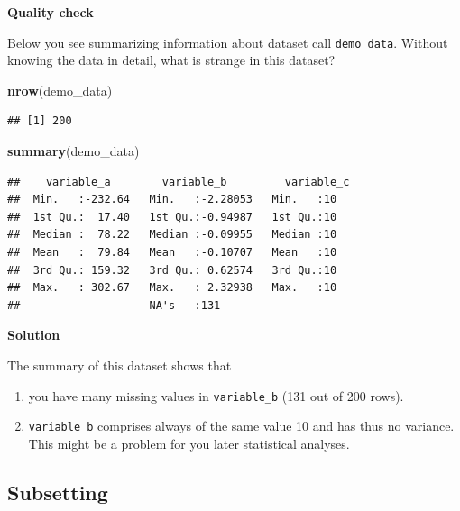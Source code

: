 \documentclass[
]{scrartcl}
\makeatletter
\newenvironment{Shaded}{\begin{snugshade}}{\end{snugshade}}
\newcommand{\KeywordTok}[1]{\textcolor[rgb]{0.13,0.29,0.53}{\textbf{#1}}}
\newcommand{\NormalTok}[1]{#1}
\providecommand{\tightlist}{%
  \setlength{\itemsep}{0pt}\setlength{\parskip}{0pt}}
\newenvironment{kframe}{%
\medskip{}
\setlength{\fboxsep}{.8em}
 \def\at@end@of@kframe{}%
 \ifinner\ifhmode%
  \def\at@end@of@kframe{\end{minipage}}%
  \begin{minipage}{\columnwidth}%
 \fi\fi%
 \def\FrameCommand##1{\hskip\@totalleftmargin \hskip-\fboxsep
 \colorbox{shadecolor}{##1}\hskip-\fboxsep
     \hskip-\linewidth \hskip-\@totalleftmargin \hskip\columnwidth}%
 \MakeFramed {\advance\hsize-\width
   \@totalleftmargin\z@ \linewidth\hsize
   \@setminipage}}%
 {\par\unskip\endMakeFramed%
 \at@end@of@kframe}
\newenvironment{rmdblock}[1]
  {
  \begin{itemize}
  \renewcommand{\labelitemi}{
    \raisebox{-.7\height}[0pt][0pt]{
      {\setkeys{Gin}{width=3em,keepaspectratio}\texttt{[image: images/\#1]}}
    }
  }
  \setlength{\fboxsep}{1em}
  \begin{kframe}
  \item
  }
  {
  \end{kframe}
  \end{itemize}
  }
\newenvironment{myexercise}
    {\begin{rmdblock}{exercise_green}}
    {\end{rmdblock}}
\newenvironment{webexsolution}[1]
    {\par\tiny\textbf{#1}}
    {\par}
\newcommand{\webexhide}[1]{\begin{webexsolution}{#1}}
\newcommand{\webexunhide}{\end{webexsolution}}
\makeatother
\begin{document}
\begin{myexercise}
\textbf{Quality check}

Below you see summarizing information about dataset call
\texttt{demo\_data}. Without knowing the data in detail, what is strange
in this dataset?
\end{myexercise}

\begin{Shaded}
\begin{Highlighting}[]
\KeywordTok{nrow}\NormalTok{(demo\_data)}
\end{Highlighting}
\end{Shaded}

\begin{verbatim}
## [1] 200
\end{verbatim}

\begin{Shaded}
\begin{Highlighting}[]
\KeywordTok{summary}\NormalTok{(demo\_data)}
\end{Highlighting}
\end{Shaded}

\begin{verbatim}
##    variable_a        variable_b         variable_c
##  Min.   :-232.64   Min.   :-2.28053   Min.   :10  
##  1st Qu.:  17.40   1st Qu.:-0.94987   1st Qu.:10  
##  Median :  78.22   Median :-0.09955   Median :10  
##  Mean   :  79.84   Mean   :-0.10707   Mean   :10  
##  3rd Qu.: 159.32   3rd Qu.: 0.62574   3rd Qu.:10  
##  Max.   : 302.67   Max.   : 2.32938   Max.   :10  
##                    NA's   :131
\end{verbatim}

\webexhide{Solution}

The summary of this dataset shows that

\begin{enumerate}
\def\labelenumi{\arabic{enumi}.}
\tightlist
\item
  you have many missing values in \texttt{variable\_b} (131 out of 200 rows).
\item
  \texttt{variable\_b} comprises always of the same value 10 and has thus no variance. This might be a problem for you later statistical analyses.
\end{enumerate}

\webexunhide

\hypertarget{nolabel}{%
\subsection{Subsetting}\label{nolabel}}
\end{document}
